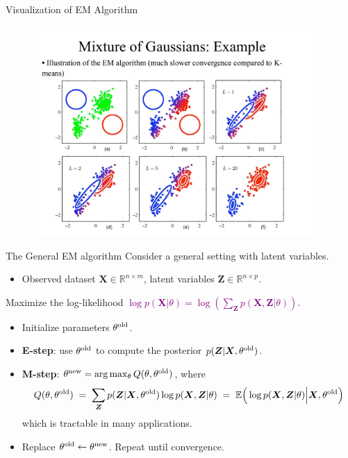\documentclass[11pt,handout,aspectratio=169]{beamer}
\begin{document}

\begin{frame}{Visualization of EM Algorithm}
\begin{figure}
\includegraphics[width=4.2in]{pics/raw3.pdf}
\end{figure}
\end{frame}


\begin{frame}{The General EM algorithm}
Consider a general setting with latent variables.
\begin{itemize}
	\item Observed dataset $\boldsymbol{X}\in \mathbb R^{n\times m}$, latent variables $\boldsymbol{Z}\in \mathbb R^{n\times p}$.
	\end{itemize}
Maximize the log-likelihood  \textcolor{purple}{$\log p(\boldsymbol{X}|\theta)=\log\left(\sum_{\boldsymbol Z}p(\boldsymbol X,\boldsymbol Z|\theta)\right)$}.
\begin{itemize}
	\item Initialize parameters $\theta^{\rm old}$.
	 \item \textbf{E-step}: use $\theta^{\rm old}$ to compute the posterior $p(\boldsymbol{Z}|\boldsymbol{X},\theta^{\rm old})$.
 	\item \textbf{M-step}: $\theta^{\rm new}=\arg\max_\theta Q(\theta,\theta^{\rm old})$, where
$$
	Q(\theta,\theta^{\rm old})\;=\;\sum_{\boldsymbol{Z}}p(\boldsymbol{Z}|\boldsymbol{X},\theta^{\rm old})\log p(\boldsymbol{X},\boldsymbol{Z}|\theta)\;=\;\mathbb E\Big(\log p(\boldsymbol{X},\boldsymbol{Z}|\theta)\Big|\boldsymbol{X},\theta^{\rm old}\Big)
$$
which is tractable in many applications.
\item Replace $\theta^{\rm old}\leftarrow\theta^{\rm new}$. Repeat until convergence.
\end{itemize}
\end{frame}
\end{document}

